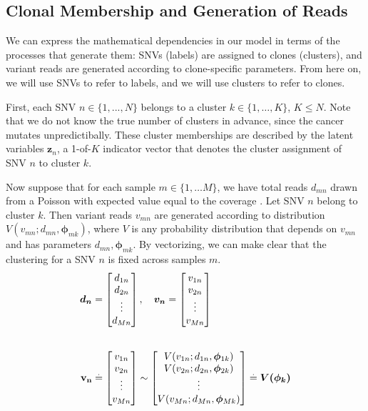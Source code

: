 \documentclass[11pt]{article}
\newcommand{\bz}{\ensuremath{\mathbf{z}}}
\newcommand{\bphi}{\ensuremath{\bm{\phi}}}
\newcommand{\defeq}{\stackrel{.}{=}}
\begin{document}
\subsection{Clonal Membership and Generation of Reads}
We can express the mathematical dependencies in our model in terms of the processes that generate them: SNVs (labels) are assigned to clones (clusters), and variant reads are generated according to clone-specific parameters. From here on, we will use SNVs to refer to labels, and we will use clusters to refer to clones.

First, each SNV $n \in \{1, ..., N\}$ belongs to a cluster $k\in\{1,\ldots,K\}$, $K \leq N$. Note that we do not know the true number of clusters in advance, since the cancer mutates unpredictibally. These cluster memberships are described by the latent variables $\bz_n$, a 1-of-$K$ indicator vector that denotes the cluster assignment of SNV $n$ to cluster $k$. 

Now suppose that for each sample $m\in\{1, \ldots M\}$, we have total reads $d_{mn}$ drawn from a Poisson with expected value equal to the coverage \cite{Lander1988}. Let SNV $n$ belong to cluster $k$. Then variant reads $v_{mn}$ are generated according to distribution $V(v_{mn}; d_{mn}, \bphi_{mk})$, where $V$ is any probability distribution that depends on $v_{mn}$ and has parameters $d_{mn}, \bphi_{mk}$. By vectorizing, we can make clear that the clustering for a SNV $n$ is fixed across samples $m$.
\begin{align}
\bm{d_{n}} &= 	\begin{bmatrix} d_{1n} \\ d_{2n} \\ \vdots \\ d_{Mn} \end{bmatrix}, \quad\bm{v_{n}} = 	\begin{bmatrix} v_{1n} \\ v_{2n} \\ \vdots \\ v_{Mn} \end{bmatrix}	\\[20pt]
	\bf{v}_{n} &\defeq 
				\begin{bmatrix}
				 	v_{1n} \\ v_{2n} \\ \vdots \\ v_{Mn}
				\end{bmatrix}
				\sim
				\begin{bmatrix}
					V(v_{1n}; d_{1n}, \bphi_{1k}) \\ V(v_{2n}; d_{2n}, \bphi_{2k}) \\ \vdots \\ V(v_{Mn}; d_{Mn}, \bphi_{Mk})
				\end{bmatrix}
				\defeq \bm{V(\bphi_k)}
\end{align}
\end{document}
